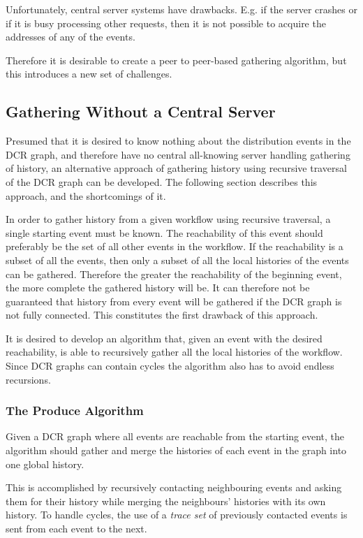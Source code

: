     \newpar Unfortunately, central server systems have drawbacks. E.g. if the server crashes or if it is busy processing other requests, then it is not possible to acquire the addresses of any of the events.
    
    Therefore it is desirable to create a peer to peer-based gathering algorithm, but this introduces a new set of challenges.
    
    \subsection{Gathering Without a Central Server}
	Presumed that it is desired to know nothing about the distribution events in the DCR graph, and therefore have no central all-knowing server handling gathering of history, an alternative approach of gathering history using recursive traversal of the DCR graph can be developed. The following section describes this approach, and the shortcomings of it. 
	
	\newpar In order to gather history from a given workflow using recursive traversal, a single starting event must be known. The reachability of this event should preferably be the set of all other events in the workflow. If the reachability is a subset of all the events, then only a subset of all the local histories of the events can be gathered. Therefore the greater the reachability of the beginning event, the more complete the gathered history will be. It can therefore not be guaranteed that history from every event will be gathered if the DCR graph is not fully connected. This constitutes the first drawback of this approach.
	
	It is desired to develop an algorithm that, given an event with the desired reachability, is able to recursively gather all the local histories of the workflow. Since DCR graphs can contain cycles the algorithm also has to avoid endless recursions.
		
	\subsubsection{The Produce Algorithm}
	Given a DCR graph where all events are reachable from the starting event, the algorithm should gather and merge the histories of each event in the graph into one global history.
	
	This is accomplished by recursively contacting neighbouring events and asking them for their history while merging the neighbours' histories with its own history. To handle cycles, the use of a \textit{trace set} of previously contacted events is sent from each event to the next.
	
